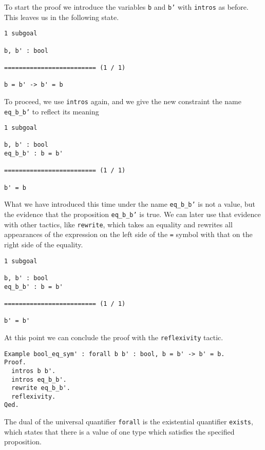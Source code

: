 To start the proof we introduce the variables \texttt{b} and \texttt{b'} with 
\texttt{intros} as before. This leaves us in the following state.

\begin{verbatim}
1 subgoal

b, b' : bool

========================= (1 / 1)

b = b' -> b' = b
\end{verbatim}

To proceed, we use \texttt{intros} again, and we give the new constraint the name \texttt{eq_b_b'}
to reflect its meaning

\begin{verbatim}
1 subgoal

b, b' : bool
eq_b_b' : b = b'

========================= (1 / 1)

b' = b
\end{verbatim}

What we have introduced this time under the name \texttt{eq_b_b'} is not a value, but the
evidence that the proposition \texttt{eq_b_b'} is true. We can later use that evidence with
other tactics, like \texttt{rewrite}, which takes an equality and rewrites all appearances of
the expression on the left side of the \texttt{=} symbol with that on the right side of the 
equality.

\begin{verbatim}
1 subgoal

b, b' : bool
eq_b_b' : b = b'

========================= (1 / 1)

b' = b'
\end{verbatim}

At this point we can conclude the proof with the \texttt{reflexivity} tactic.

\begin{verbatim}
Example bool_eq_sym' : forall b b' : bool, b = b' -> b' = b.
Proof.
  intros b b'.
  intros eq_b_b'.
  rewrite eq_b_b'.
  reflexivity.
Qed.
\end{verbatim}

The dual of the universal quantifier \texttt{forall} is the existential quantifier
\texttt{exists}, which states that there is a value of one type which satisfies the specified
proposition.


